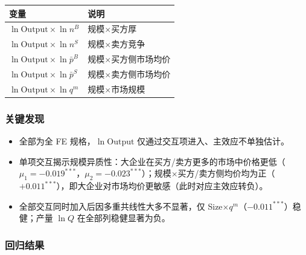 \documentclass[12pt]{article}
\begin{document}
\begin{table}[H]
  \centering\small
  \begin{tabular}{L{4.8cm} L{9.2cm}}
    \toprule
    变量 & 说明 \\
    \midrule
    $\ln\mathrm{Output} \times \ln n^B$       & 规模$\times$买方厚 \\[3pt]
    $\ln\mathrm{Output} \times \ln n^S$       & 规模$\times$卖方竞争 \\[3pt]
    $\ln\mathrm{Output} \times \ln\bar{p}^{B}$  & 规模$\times$买方侧市场均价 \\[3pt]
    $\ln\mathrm{Output} \times \ln\bar{p}^{S}$  & 规模$\times$卖方侧市场均价 \\[3pt]
    $\ln\mathrm{Output} \times \ln q^m$       & 规模$\times$市场规模 \\
    \bottomrule
  \end{tabular}
\end{table}

\subsubsection*{关键发现}

\begin{itemize}[nosep]
  \item 全部为全 FE 规格，$\ln\mathrm{Output}$ 仅通过交互项进入、主效应不单独估计。
  \item 单项交互揭示规模异质性：大企业在买方/卖方更多的市场中价格更低（$\mu_1=-0.019^{***}$，$\mu_2=-0.023^{***}$）；规模$\times$买方/卖方侧均价均为正（$+0.011^{***}$），即大企业对市场均价更敏感（此时对应主效应转负）。
  \item 全部交互同时加入后因多重共线性大多不显著，仅 Size$\times q^m$（$-0.011^{***}$）稳健；产量 $\ln Q$ 在全部列稳健显著为负。
\end{itemize}



\subsubsection*{回归结果}
\end{document}
